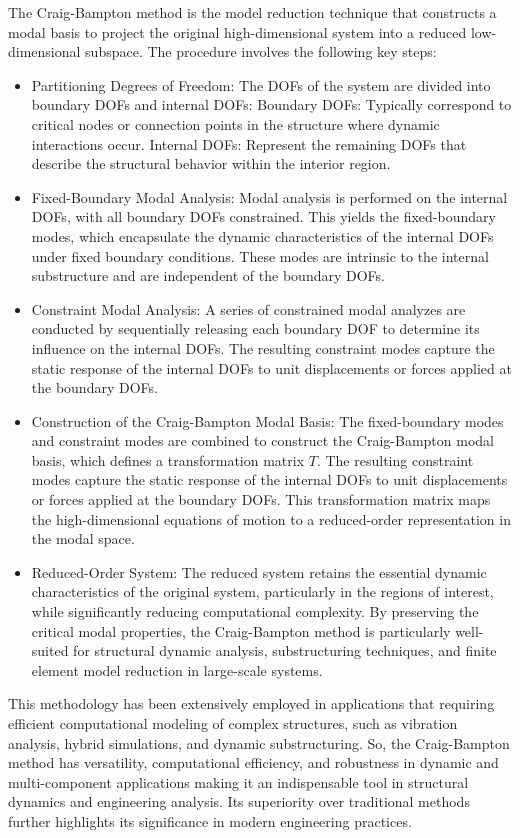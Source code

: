 \documentclass[a4paper, 10pt, conference]{ieeeconf}      %
\begin{document}
The Craig-Bampton method is the model reduction technique that constructs a modal basis to project the original high-dimensional system into a reduced low-dimensional subspace. The procedure involves the following key steps:
\begin{itemize}
    \item Partitioning Degrees of Freedom: The DOFs of the system are divided into boundary DOFs and internal DOFs:
        Boundary DOFs: Typically correspond to critical nodes or connection points in the structure where dynamic interactions occur.
        Internal DOFs: Represent the remaining DOFs that describe the structural behavior within the interior region.
    \item Fixed-Boundary Modal Analysis: Modal analysis is performed on the internal DOFs, with all boundary DOFs constrained.
        This yields the fixed-boundary modes, which encapsulate the dynamic characteristics of the internal DOFs under fixed boundary conditions.
        These modes are intrinsic to the internal substructure and are independent of the boundary DOFs.
    \item Constraint Modal Analysis: A series of constrained modal analyzes are conducted by sequentially releasing each boundary DOF to determine its influence on the internal DOFs.
        The resulting constraint modes capture the static response of the internal DOFs to unit displacements or forces applied at the boundary DOFs.
    \item Construction of the Craig-Bampton Modal Basis: The fixed-boundary modes and constraint modes are combined to construct the Craig-Bampton modal basis, which defines a transformation matrix $T$.
        The resulting constraint modes capture the static response of the internal DOFs to unit displacements or forces applied at the boundary DOFs.
        This transformation matrix maps the high-dimensional equations of motion to a reduced-order representation in the modal space.
    \item Reduced-Order System: The reduced system retains the essential dynamic characteristics of the original system, particularly in the regions of interest, while significantly reducing computational complexity. By preserving the critical modal properties, the Craig-Bampton method is particularly well-suited for structural dynamic analysis, substructuring techniques, and finite element model reduction in large-scale systems.
\end{itemize}

This methodology has been extensively employed in applications that requiring efficient computational modeling of complex structures, such as vibration analysis, hybrid simulations, and dynamic substructuring.
So, the Craig-Bampton method has versatility, computational efficiency, and robustness in dynamic and multi-component applications making it an indispensable tool in structural dynamics and engineering analysis. Its superiority over traditional methods further highlights its significance in modern engineering practices.
\end{document}
